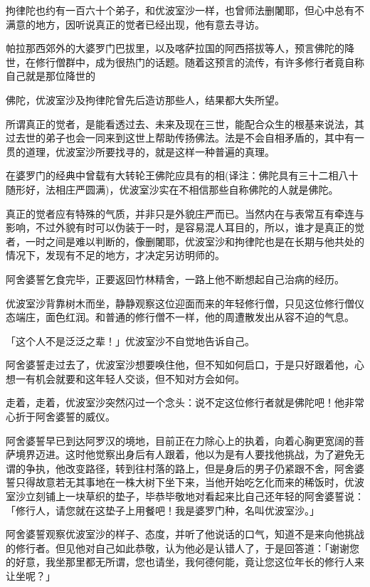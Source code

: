 \documentclass[12pt,twoside,openany]{book}
\begin{document}
拘律陀也约有一百六十个弟子，和优波室沙一样，也曾师法删闍耶，但心中总有不满意的地方，因听说真正的觉者已经出现，他有意去寻访。

帕拉那西郊外的大婆罗门巴拔里，以及喀萨拉国的阿西搭拔等人，预言佛陀的降世，在修行僧群中，成为很热门的话题。随着这预言的流传，有许多修行者竟自称自己就是那位降世的

佛陀，优波室沙及拘律陀曾先后造访那些人，结果都大失所望。

所谓真正的觉者，是能看透过去、未来及现在三世，能配合众生的根基来说法，其过去世的弟子也会一同来到这世上帮助传扬佛法。法是不会自相矛盾的，其中有一贯的道理，优波室沙所要找寻的，就是这样一种普遍的真理。

在婆罗门的经典中曾载有大转轮王佛陀应具有的相(译注：佛陀具有三十二相八十随形好，法相庄严圆满)，优波室沙实在不相信那些自称佛陀的人就是佛陀。

真正的觉者应有特殊的气质，并非只是外貌庄严而已。当然内在与表常互有牵连与影响，不过外貌有时可以伪装于一时，是容易混人耳目的，所以，谁才是真正的觉者，一时之间是难以判断的，像删闍耶，优波室沙和拘律陀也是在长期与他共处的情况下，发现有不足的地方，才决定另访明师的。

阿舍婆誓乞食完毕，正要返回竹林精舍，一路上他不断想起自己治病的经历。

优波室沙背靠树木而坐，静静观察这位迎面而来的年轻修行僧，只见这位修行僧仪态端庄，面色红润。和普通的修行僧不一样，他的周遭散发出从容不迫的气息。

「这个人不是泛泛之辈！」优波室沙不自觉地告诉自己。

阿舍婆誓走过去了，优波室沙想要唤住他，但不知如何启口，于是只好跟着他，心想一有机会就要和这年轻人交谈，但不知对方会如何。

走着，走着，优波室沙突然闪过一个念头：说不定这位修行者就是佛陀吧！他非常心折于阿舍婆誓的威仪。

阿舍婆誓早已到达阿罗汉的境地，目前正在力除心上的执着，向着心胸更宽阔的菩萨境界迈进。这时他觉察出身后有人跟着，他以为是有人要找他挑战，为了避免无谓的争执，他改变路径，转到往村落的路上，但是身后的男子仍紧跟不舍，阿舍婆誓只得故意若无其事地在一株大树下坐下来，当他开始吃乞化而来的稀饭时，优波室沙立刻铺上一块草织的垫子，毕恭毕敬地对看起来比自己还年轻的阿舍婆誓说：「修行人，请您就在这垫子上用餐吧！我是婆罗门种，名叫优波室沙。」

阿舍婆誓观察优波室沙的样子、态度，并听了他说话的口气，知道不是来向他挑战的修行者。但见他对自己如此恭敬，认为他必是认错人了，于是回答道：「谢谢您的好意，我坐那里都无所谓，您也请坐，我何德何能，竟让您这位年长的修行人来让坐呢？」
\end{document}

